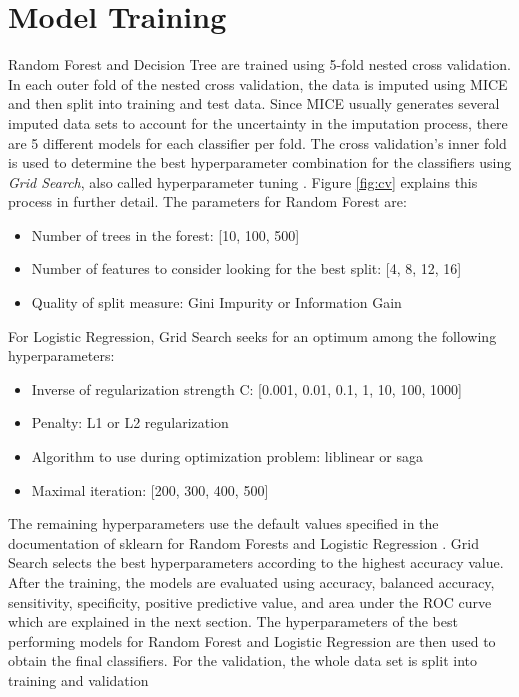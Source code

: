\section{Model Training}
Random Forest and Decision Tree are trained using 5-fold nested cross 
validation.
In each outer fold of the nested cross validation, the data is imputed using 
MICE and then split into training and test data. Since MICE usually generates 
several imputed data sets to account for the uncertainty in the imputation 
process, there are 5 different models for each classifier per fold. The cross 
validation's inner fold is used to determine the best hyperparameter 
combination for the classifiers using \textit{Grid Search}, also called 
hyperparameter tuning \cite{RN191}. Figure \ref{fig:cv} explains this process 
in further detail. The parameters for Random Forest are:
\begin{itemize}
 \item Number of trees in the forest: [10, 100, 500]
 \item Number of features to consider looking for the best split: [4, 8, 12, 16]
 \item Quality of split measure: Gini Impurity or Information Gain
\end{itemize}
For Logistic Regression, Grid Search seeks for an optimum among the 
following hyperparameters:
\begin{itemize}
 \item Inverse of regularization strength C: [0.001, 0.01, 0.1, 1, 10, 100, 
1000]
 \item Penalty: L1 or L2 regularization
 \item Algorithm to use during optimization problem: liblinear or saga
 \item Maximal iteration: [200, 300, 400, 500]
\end{itemize}
The remaining hyperparameters use the default values specified in the 
documentation of sklearn for Random Forests and Logistic Regression 
\cite{RN191}.
Grid Search selects the best hyperparameters according to the highest accuracy 
value.
\\
After the training, the models are evaluated using accuracy, balanced 
accuracy, sensitivity, 
specificity, positive predictive value, and area under the ROC curve which are 
explained in the next section.
The hyperparameters of the best performing models for Random Forest and 
Logistic Regression are then used to obtain the final classifiers.
For the validation, the whole data set is split into training and validation 
